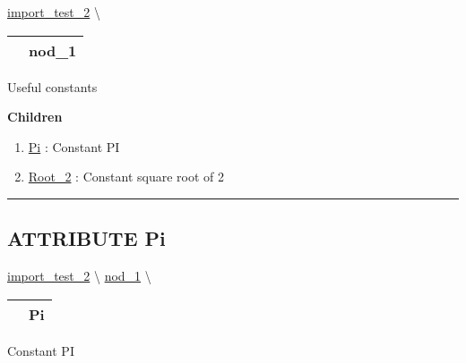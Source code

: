 \hypertarget{ecldoc:Constants}{}
\hspace{0pt} \hyperlink{ecldoc:import_test_2}{import_test_2} \textbackslash 

{\renewcommand{\arraystretch}{1.5}
\begin{tabularx}{\textwidth}{|>{\raggedright\arraybackslash}l|X|}
\hline
\hspace{0pt}\mytexttt{\color{red} } & \textbf{nod\_1} \\
\hline
\end{tabularx}
}

\par





Useful constants







\textbf{Children}
\begin{enumerate}
\item \hyperlink{ecldoc:constants.pi}{Pi}
: Constant PI
\item \hyperlink{ecldoc:constants.root_2}{Root\_2}
: Constant square root of 2
\end{enumerate}

\rule{\linewidth}{0.5pt}

\subsection*{\textsf{\colorbox{headtoc}{\color{white} ATTRIBUTE}
Pi}}

\hypertarget{ecldoc:constants.pi}{}
\hspace{0pt} \hyperlink{ecldoc:import_test_2}{import_test_2} \textbackslash 
\hspace{0pt} \hyperlink{ecldoc:Constants}{nod_1} \textbackslash 

{\renewcommand{\arraystretch}{1.5}
\begin{tabularx}{\textwidth}{|>{\raggedright\arraybackslash}l|X|}
\hline
\hspace{0pt}\mytexttt{\color{red} } & \textbf{Pi} \\
\hline
\end{tabularx}
}

\par





Constant PI








